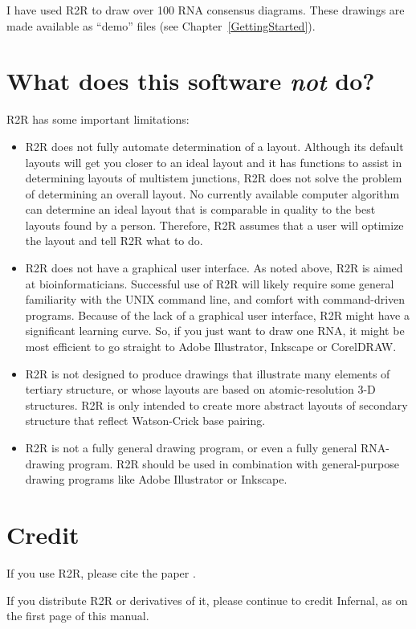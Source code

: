 \documentclass[letterpaper,12pt]{report}
\begin{document}
I have used R2R to draw over 100 RNA consensus diagrams.  These drawings are made available as ``demo'' files (see Chapter~\ref{GettingStarted}).

\section{What does this software {\em not} do?}

R2R has some important limitations:
\begin{itemize}
\item R2R does not fully automate determination of a layout.  Although its default layouts will get you closer to an ideal layout and it has functions to assist in determining layouts of multistem junctions, R2R does not solve the problem of determining an overall layout.  No currently available computer algorithm can determine an ideal layout that is comparable in quality to the best layouts found by a person.  Therefore, R2R assumes that a user will optimize the layout and tell R2R what to do.
\item R2R does not have a graphical user interface.  As noted above, R2R is aimed at bioinformaticians.  Successful use of R2R will likely require some general familiarity with the UNIX command line, and comfort with command-driven programs.
Because of the lack of a graphical user interface, R2R might have a significant learning curve.
So, if you just want to draw one RNA, it might be most efficient to go straight to Adobe Illustrator, Inkscape or CorelDRAW.
\item R2R is not designed to produce drawings that illustrate many elements of tertiary structure, or whose layouts are based on atomic-resolution 3-D structures.
R2R is only intended to create more abstract layouts of secondary structure that reflect Watson-Crick base pairing.
\item R2R is not a fully general drawing program, or even a fully general RNA-drawing program.  R2R should be used in combination with general-purpose drawing programs like Adobe Illustrator or Inkscape.
\end{itemize}

\section{Credit}

If you use R2R, please cite the paper \cite{RtoR}.

If you distribute R2R or derivatives of it, please continue to credit Infernal, as on the first page of this manual.
\end{document}
